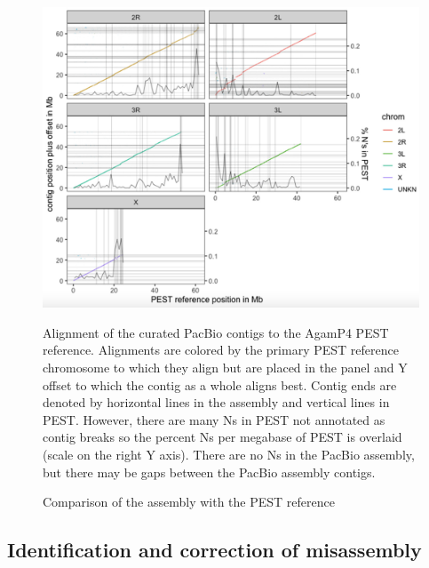 \begin{figure}[htbp!]

\caption{Comparison of the assembly with the PEST reference}
\label{figure:dotplot}
\begin{centering}
\includegraphics[width=1.0\textwidth]{dotplot.png}
\par{Alignment of the curated PacBio contigs to the AgamP4 PEST reference. Alignments are colored by the primary PEST reference chromosome to which they align but are placed in the panel and Y offset to which the contig as a whole aligns best. Contig ends are denoted by horizontal lines in the assembly and vertical lines in PEST. However, there are many Ns in PEST not annotated as contig breaks so the percent Ns per megabase of PEST is overlaid (scale on the right Y axis). There are no Ns in the PacBio assembly, but there may be gaps between the PacBio assembly contigs.}
\end{centering}
\end{figure}


\subsection{Identification and correction of misassembly}

